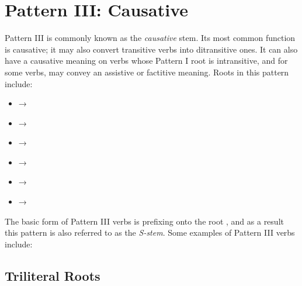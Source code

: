 \documentclass[grammar]{subfiles}
\begin{document}

\clearpage
\section{Pattern III: Causative}
\label{sec:vm_pattern_iii}

Pattern III is commonly known as the \emph{causative} stem.  Its most common
function is causative; it may also convert transitive verbs into ditransitive
ones.  It can also have a causative meaning on verbs whose Pattern I root is
intransitive, and for some verbs, may convey an assistive or factitive meaning.
Roots in this pattern include: 

\begin{itemize}
  \item {} → 
  \item {} → 
  \item {} → 
  \item {} → 
  \item {} → 
  \item {} → 
\end{itemize}


The basic form of Pattern III verbs is prefixing  onto the root
, and as a result this pattern is also referred to as the
\emph{S-stem}.  Some examples of Pattern III verbs include:

\subsection{Triliteral Roots}
\label{ssec:vm_iii_triliteral}
\end{document}
